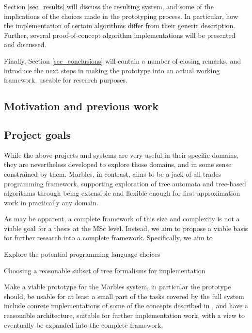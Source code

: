 Section \ref{sec_results} will discuss the resulting system, and some of
the implications of the choices made in the prototyping process. In
particular, how the implementation of certain algorithms differ from their
generic description. Further, several proof-of-concept algorithm
implementations will be presented and discussed.

Finally, Section \ref{sec_conclusions} will contain a number of closing
remarks, and introduce the next steps in making the prototype into an
actual working framework, useable for research purposes.

\subsection{Motivation and previous work}



\subsection{Project goals}

While the above projects and systems are very useful in their specific
domains, they are nevertheless developed to explore those domains, and in
some sense constrained by them. Marbles, in contrast, aims to be a
jack-of-all-trades programming framework, supporting exploration of tree
automata and tree-based algorithms through being extensible and flexible
enough for first-approximation work in practically any domain.

As may be apparent, a complete framework of this size and complexity is not
a viable goal for a thesis at the MSc level. Instead, we aim to propose a
viable basis for further research into a complete framework. Specifically,
we aim to
\begin{compactitem}
\item Explore the potential programming language choices
\item Choosing a reasonable subset of tree formalisms for implementation
\item Make a viable prototype for the Marbles system, in particular the
prototype should,
\subitem be usable for at least a small part of the tasks covered by the
full system
\subitem include conrete implementations of some of the concepts described in
\cite{drewes_marbles}, and
\subitem have a reasonable architecture, suitable for further
implementation work, with a view to eventually be expanded into the
complete framework.
\end{compactitem}







